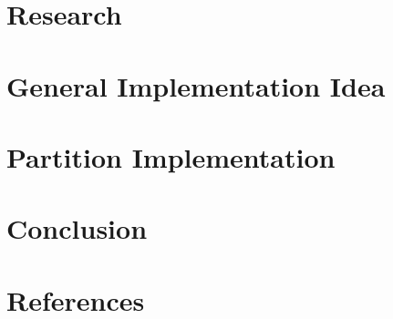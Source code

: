\documentclass{article} %
\begin{document}
{{\section{Research}\label{sect:research}}}




\clearpage
{{\section{General Implementation Idea}\label{sect:generalImpl}}}




\clearpage
{{\section{Partition Implementation}\label{sect:implementation}}}




\clearpage
{{\section{Conclusion}\label{sect:conclusion}}}




\clearpage
{{\section{References}\label{sect:biblio}}}

\end{document}
